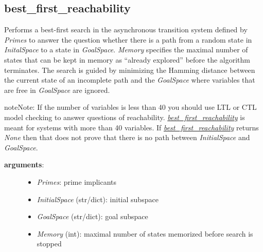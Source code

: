 \documentclass[letterpaper,10pt,english]{sphinxmanual}
\begin{document}
\subsection{best\_first\_reachability}
\label{StateTransitionGraphs:id7}\label{StateTransitionGraphs:best-first-reachability}

\begin{fulllineitems}
\label{StateTransitionGraphs:PyBoolNet.StateTransitionGraphs.best_first_reachability}
Performs a best-first search in the asynchronous transition system defined by \emph{Primes} to answer the question whether there
is a path from a random state in \emph{InitalSpace} to a state in \emph{GoalSpace}.
\emph{Memory} specifies the maximal number of states that can be kept in memory as ``already explored'' before the algorithm terminates.
The search is guided by minimizing the Hamming distance between the current state of an incomplete path and the \emph{GoalSpace}
where variables that are free in \emph{GoalSpace} are ignored.

\begin{notice}{note}{Note:}
If the number of variables is less than 40 you should use LTL or CTL model checking to answer questions of reachability.
{\hyperref[StateTransitionGraphs:best-first-reachability]{\emph{best\_first\_reachability}}} is meant for systems with more than 40 variables.
If {\hyperref[StateTransitionGraphs:best-first-reachability]{\emph{best\_first\_reachability}}} returns \emph{None} then that does not prove that there is no path between \emph{InitialSpace} and \emph{GoalSpace}.
\end{notice}
\begin{description}
\item[{\textbf{arguments}:}] \leavevmode\begin{itemize}
\item {} 
\emph{Primes}: prime implicants

\item {} 
\emph{InitialSpace} (str/dict): initial subspace

\item {} 
\emph{GoalSpace} (str/dict): goal subspace

\item {} 
\emph{Memory} (int): maximal number of states memorized before search is stopped


\end{itemize}
\end{description}
\end{fulllineitems}
\end{document}
